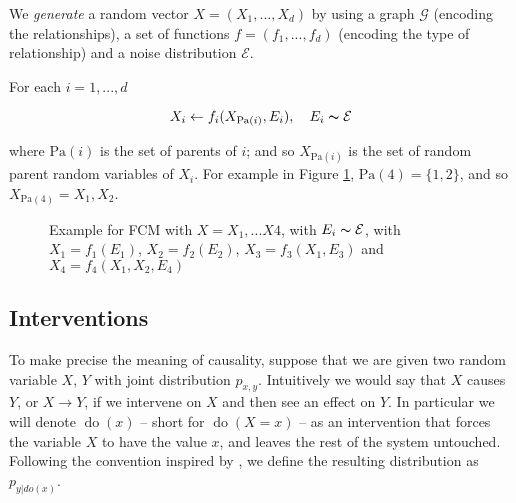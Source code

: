 We \textit{generate} a random vector $X = (X_1, ..., X_d)$ by using a graph $\mathcal{G}$ (encoding the relationships),
a set of functions $f = (f_1, ..., f_d)$ (encoding the type of relationship) and a noise distribution $\mathcal{E}$.

For each $i = 1, ..., d$

$$
    X_i \leftarrow f_i(X_{\text{Pa}(i)}, E_i), \quad E_i \thicksim \mathcal{E}
$$

where $\text{Pa}(i)$ is the set of parents of $i$; and so $X_{\text{Pa}(i)}$ is the set of random parent
random variables of $X_i$. For example in Figure \ref{fig:fcm_1}, $\text{Pa}(4) = \{1, 2\}$, 
and so $X_{\text{Pa}(4)} = X_1, X_2$.

\begin{figure}[!h]
    \centering

    \caption{ Example for FCM with $X = X_1, ... X4$, with $E_i \thicksim \mathcal{E}$, 
    with $X_1 = f_1(E_1)$, $X_2 = f_2(E_2)$, $X_3 = f_3(X_1, E_3)$ and 
    $X_4 = f_4(X_1, X_2, E_4)$}
    \label{fig:fcm_1}

\end{figure}



\subsection{Interventions}

To make precise the meaning of causality, suppose that we are given 
two random variable $X$, $Y$ with joint distribution $p_{x, y}$. Intuitively we 
would say that $X$ causes $Y$, or $X \rightarrow Y$, if we intervene on $X$ and then see an effect on $Y$. In particular
we will denote $\operatorname{do}(x)$ -- short for $\operatorname{do}(X = x)$ -- as an intervention
that forces the variable $X$ to have the value $x$, and leaves the rest of the system untouched. 
Following the convention inspired by \cite{pearl2000causality}, 
we define the resulting distribution as $p_{y|do(x)}$.

